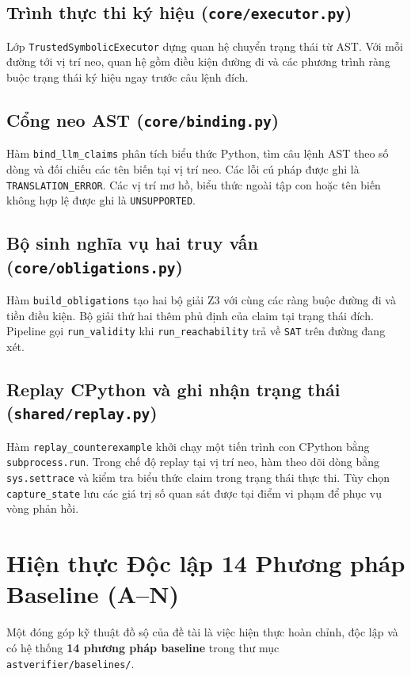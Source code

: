 \subsection{Trình thực thi ký hiệu (\texttt{core/executor.py})}
Lớp \texttt{TrustedSymbolicExecutor} dựng quan hệ chuyển trạng thái từ AST. Với mỗi đường tới vị trí neo, quan hệ gồm điều kiện đường đi và các phương trình ràng buộc trạng thái ký hiệu ngay trước câu lệnh đích.

\subsection{Cổng neo AST (\texttt{core/binding.py})}
Hàm \texttt{bind\_llm\_claims} phân tích biểu thức Python, tìm câu lệnh AST theo số dòng và đối chiếu các tên biến tại vị trí neo. Các lỗi cú pháp được ghi là \texttt{TRANSLATION\_ERROR}. Các vị trí mơ hồ, biểu thức ngoài tập con hoặc tên biến không hợp lệ được ghi là \texttt{UNSUPPORTED}.

\subsection{Bộ sinh nghĩa vụ hai truy vấn (\texttt{core/obligations.py})}
Hàm \texttt{build\_obligations} tạo hai bộ giải Z3 với cùng các ràng buộc đường đi và tiền điều kiện. Bộ giải thứ hai thêm phủ định của claim tại trạng thái đích. Pipeline gọi \texttt{run\_validity} khi \texttt{run\_reachability} trả về \texttt{SAT} trên đường đang xét.

\subsection{Replay CPython và ghi nhận trạng thái (\texttt{shared/replay.py})}
Hàm \texttt{replay\_counterexample} khởi chạy một tiến trình con CPython bằng \texttt{subprocess.run}. Trong chế độ replay tại vị trí neo, hàm theo dõi dòng bằng \texttt{sys.settrace} và kiểm tra biểu thức claim trong trạng thái thực thi. Tùy chọn \texttt{capture\_state} lưu các giá trị số quan sát được tại điểm vi phạm để phục vụ vòng phản hồi.

\section{Hiện thực Độc lập 14 Phương pháp Baseline (A--N)}
\label{sec:baselines_implementation}

Một đóng góp kỹ thuật đồ sộ của đề tài là việc hiện thực hoàn chỉnh, độc lập và có hệ thống \textbf{14 phương pháp baseline} trong thư mục \texttt{astverifier/baselines/}.

